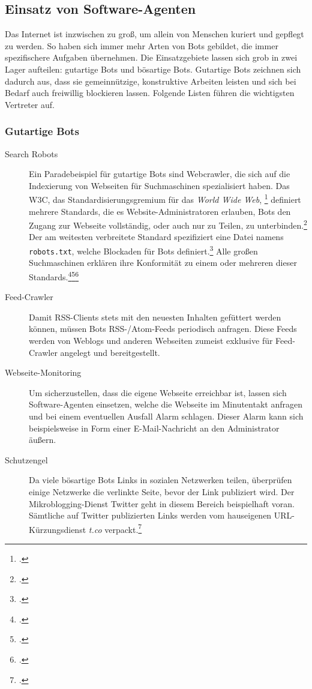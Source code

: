 \subsection{Einsatz von Software-Agenten}
\label{sub:einsatz-von-software-agenten}

Das Internet ist inzwischen zu groß, um allein von Menschen kuriert und
gepflegt zu werden. So haben sich immer mehr Arten von Bots gebildet, die immer
spezifischere Aufgaben übernehmen. Die Einsatzgebiete lassen sich grob in zwei
Lager aufteilen: gutartige Bots und bösartige Bots. Gutartige Bots zeichnen
sich dadurch aus, dass sie gemeinnützige, konstruktive Arbeiten leisten und
sich bei Bedarf auch freiwillig blockieren lassen. Folgende Listen führen die
wichtigsten Vertreter auf.

\subsubsection{Gutartige Bots}
\label{ssub:gutartige-bots}

\begin{description}
  \item[Search Robots]
  Ein Paradebeispiel für gutartige Bots sind Webcrawler, die sich auf die
  Indexierung von Webseiten für Suchmaschinen spezialisiert haben. Das W3C, das
  Standardisierungsgremium für das \emph{World Wide Web},
  \footcite{w3c:standards} definiert mehrere Standards, die es
  Website-Administratoren erlauben, Bots den Zugang zur Webseite vollständig,
  oder auch nur zu Teilen, zu unterbinden.\footcite{w3c:searchBots}
  \label{robotstxt} Der am weitesten verbreitete Standard spezifiziert eine
  Datei namens \texttt{robots.txt}, welche Blockaden für Bots
  definiert.\footcite{w3c:robotsTxt} Alle großen Suchmaschinen erklären ihre
  Konformität zu einem oder mehreren dieser Standards.\footcite{robotsTagGoogle}\footcite{yandexUsingRobotsTxt}\footcite{duckduckgoBot}
  
  \item[Feed-Crawler]
  Damit RSS-Clients stets mit den neuesten Inhalten gefüttert werden können,
  müssen Bots RSS-/Atom-Feeds periodisch anfragen. Diese Feeds werden von
  Weblogs und anderen Webseiten zumeist exklusive für Feed-Crawler angelegt und
  bereitgestellt.
  
  \item[Webseite-Monitoring]
  Um sicherzustellen, dass die eigene Webseite erreichbar ist, lassen sich
  Software-Agenten einsetzen, welche die Webseite im Minutentakt anfragen und
  bei einem eventuellen Ausfall Alarm schlagen. Dieser Alarm kann sich
  beispielsweise in Form einer E-Mail-Nachricht an den Administrator äußern.
  
  \item[Schutzengel]
  Da viele bösartige Bots Links in sozialen Netzwerken teilen, überprüfen
  einige Netzwerke die verlinkte Seite, bevor der Link publiziert wird. Der
  Mikroblogging-Dienst Twitter geht in diesem Bereich beispielhaft voran.
  Sämtliche auf Twitter publizierten Links werden vom hauseigenen
  URL-Kürzungsdienst \emph{t.co} verpackt.\footcite{twitterShortLink}
\end{description}

